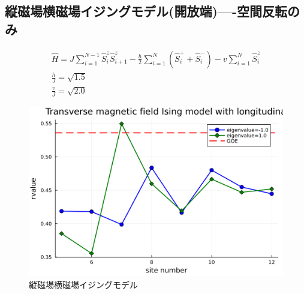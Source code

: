 \documentclass{ltjsarticle}
\begin{document}
\subsection*{縦磁場横磁場イジングモデル(開放端)—-空間反転のみ}
\begin{gather}
  \hat{H}=J\sum_{i=1}^{N-1} \hat{S}_i^z\hat{S}_{i+1}^z - \frac{h}{2}\sum_{i=1}^{N} \left( \hat{S}_i^+ + \hat{S}_i^- \right) - v\sum_{i=1}^{N} \hat{S}_i^z\\
  \frac{h}{J}=\sqrt{1.5}\\
  \frac{v}{J}=\sqrt{2.0}
\end{gather}
\begin{figure}[H]
  \centering
  \includegraphics[width=150mm]{rvalue_transverse.png}
  \caption{縦磁場横磁場イジングモデル}
  \label{fig:rvalue_transverse}
\end{figure}
\end{document}
